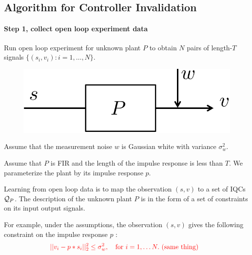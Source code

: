 \documentclass[11pt, onecolumn]{article}
\newcommand{\rb}[1]{{\color{red}{ #1}}}
\begin{document}
\subsection{Algorithm for Controller Invalidation}

\paragraph{Step 1,  collect open loop experiment data}
Run open loop experiment for unknown plant $P$ to obtain $N$ pairs of length-$T$ signals $\{(s_i,v_i) :
i=1,\dots, N\}$.
\begin{figure}[!ht]
  \centering
  \includegraphics[width=.3\linewidth]{sys3.pdf}
\end{figure}

\begin{assumption}
  Assume that the measurement noise $w$ is Gaussian white with variance $\sigma_w^2$.
\end{assumption}

\begin{assumption}
  Assume that $P$ is FIR and the length of the impulse response is less than $T$. We parameterize
  the plant by its impulse response $p$.
\end{assumption}


\begin{definition}
  Learning from open loop data is to map the observation $(s,v)$ to a set of IQCs $\mathcal Q_P$.  The
  description of the unknown plant $P$ is in the form of a set of constraints on its input output
  signals.


  For example, under the assumptions, the observation $(s,v)$ gives the following constraint on the
  impulse response $p$ \rb{Doesn't this only hold in expectation/WHP? The constraint is fine, but it doesn't ``follow from the assumption''.}:
  \begin{align*}
    &\; \rb{||v_i - p*s_i||_2^2 \leq \sigma_w^2, \quad \tx{for }i= 1,\dots N. \tx{ (same thing)}}
  \end{align*}

\end{definition}
\end{document}
